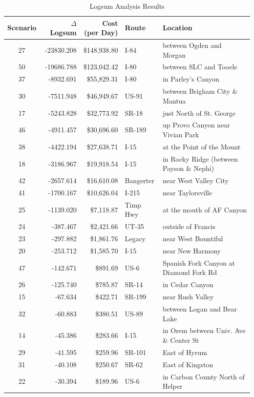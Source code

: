\begin{table}
\caption{\label{tab:linkresults}Logsum Analysis Results}
\centering
\begin{tabular}[t]{crrll}
\toprule
Scenario & $\Delta$ Logsum & \makecell{Cost \\(per Day)} & Route & Location\\
\midrule
27 & -23830.208 & \$148,938.80 & I-84 & between Ogden and Morgan\\
50 & -19686.788 & \$123,042.42 & I-80 & between SLC and Tooele\\
37 & -8932.691 & \$55,829.31 & I-80 & in Parley's Canyon\\
30 & -7511.948 & \$46,949.67 & US-91 & between Brigham City \& Mantua\\
17 & -5243.828 & \$32,773.92 & SR-18 & just North of St. George\\
46 & -4911.457 & \$30,696.60 & SR-189 & up Provo Canyon near Vivian Park\\
38 & -4422.194 & \$27,638.71 & I-15 & at the Point of the Mount\\
18 & -3186.967 & \$19,918.54 & I-15 & in Rocky Ridge (between Payson \& Nephi)\\
42 & -2657.614 & \$16,610.08 & Bangerter & near West Valley City\\
41 & -1700.167 & \$10,626.04 & I-215 & near Taylorsville\\
25 & -1139.020 & \$7,118.87 & Timp Hwy & at the mouth of AF Canyon\\
24 & -387.467 & \$2,421.66 & UT-35 & outside of Francis\\
23 & -297.882 & \$1,861.76 & Legacy & near West Bountiful\\
20 & -253.712 & \$1,585.70 & I-15 & near New Harmony\\
47 & -142.671 & \$891.69 & US-6 & Spanish Fork Canyon at Diamond Fork Rd\\
26 & -125.740 & \$785.87 & SR-14 & in Cedar Canyon\\
15 & -67.634 & \$422.71 & SR-199 & near Rush Valley\\
32 & -60.883 & \$380.51 & US-89 & between Logan and Bear Lake\\
14 & -45.386 & \$283.66 & I-15 & in Orem between Univ. Ave \& Center St\\
29 & -41.595 & \$259.96 & SR-101 & East of Hyrum\\
31 & -40.108 & \$250.67 & SR-62 & East of Kingston\\
22 & -30.394 & \$189.96 & US-6 & in Carbon County North of Helper\\

\end{tabular}
\end{table}
